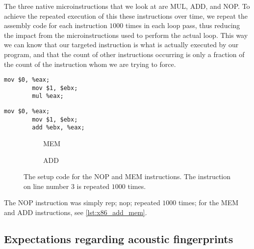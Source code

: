 The three native microinstructions that we look at are MUL, ADD, and NOP. 
To achieve the repeated execution of this these instructions over time, we repeat the assembly code for each instruction \(1000\) times in each loop pass, thus reducing the impact from the microinstructions used to perform the actual loop. 
This way we can know that our targeted instruction is what is actually executed by our program, and that the count of other instructions occurring is only a fraction of the count of the instruction whom we are trying to force.

\newsavebox{\MEMfigure}
	\begin{lrbox}{\MEMfigure}%
	\begin{lstlisting}[language={[x86masm]Assembler}]
		mov $0, %eax;
		mov $1, $ebx;
		mul %eax;
	\end{lstlisting}
\end{lrbox}

\newsavebox{\ADDfigure}
	\begin{lrbox}{\ADDfigure}%
	\begin{lstlisting}[language={[x86masm]Assembler}]
		mov $0, %eax;
		mov $1, $ebx;
		add %ebx, %eax;
	\end{lstlisting}
\end{lrbox}

\begin{figure}[h]
    \begin{subfigure}{0.5\textwidth}
        \centering
        \usebox{\MEMfigure}
        \caption{MEM}
    \end{subfigure}
    \begin{subfigure}{0.5\textwidth}
        \centering
        \usebox{\ADDfigure}
        \caption{ADD}
    \end{subfigure}
	\caption{The setup code for the NOP and MEM instructions. The instruction on line number 3 is repeated \(1000\) times.}
	\label{lst:x86_add_mem}
\end{figure}

The NOP instruction was simply rep; nop; repeated \(1000\) times; for the MEM and ADD instructions, see \autoref{lst:x86_add_mem}. 


\subsection{Expectations regarding acoustic fingerprints}

